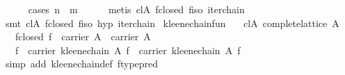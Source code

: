 \begin{isabellebody}
\ \ \ \ \isamarkupfalse%
\ {}cases\ {}n\ {}\ m{}{}\isanewline
\ \ \ \ \isamarkupfalse%
\ {}metis\ cl{}A\ f{}closed\ f{}iso\ iter{}chain{}\isanewline
\ \ \ \ \isamarkupfalse%
\ {}smt\ cl{}A\ f{}closed\ f{}iso\ hyp\ iter{}chain{}\isanewline
{}\isamarkupfalse%
%
\endisatagproof
{\isafoldproof}%
%
\isadelimproof
\isanewline
%
\endisadelimproof
\isanewline
{}\isamarkupfalse%
\ kleene{}chain{}fun{}\isanewline
\ \ \ cl{}A{}\ {}complete{}lattice\ A{}\isanewline
\ \ \ f{}closed{}\ {}f\ {}\ carrier\ A\ {}\ carrier\ A{}\isanewline
\ \ \ {}f\ {}\ carrier\ {}kleene{}chain\ A\ f{}\ {}\ carrier\ {}kleene{}chain\ A\ f{}{}\isanewline
%
\isadelimproof
\ \ %
\endisadelimproof
%
\isatagproof
{}\isamarkupfalse%
\ {}simp\ add{}\ kleene{}chain{}def\ ftype{}pred{}\isanewline

\end{isabellebody}
